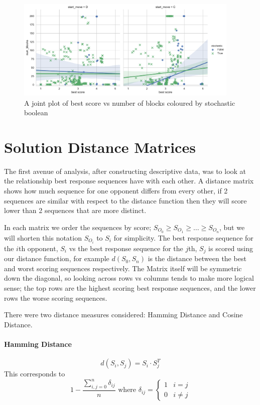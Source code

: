 \begin{figure}[ht]
    \includegraphics[width=0.95\textwidth, center]{./img/descriptive/cor_plot.pdf}
    \caption{A joint plot of best score vs number of blocks coloured by stochastic boolean}\label{fig:cor_plot}
\end{figure}

\section{Solution Distance Matrices}\label{sec:distance_matracies}
The first avenue of analysis, after constructing descriptive data, was to look at the relationship best response sequences have with each other.
A distance matrix shows how much  sequence for one opponent differs from every other, if 2 sequences are similar with respect to the distance function then they will score lower than 2 sequences that are more distinct.

In each matrix we order the sequences by score; $S_{O_0}\ge S_{O_1} \ge \ldots \ge S_{O_n}$, but we will shorten this notation $S_{O_i}$ to $S_{i}$ for simplicity.
The best response sequence for the $i$th opponent, $S_i$ vs the best response sequence for the $j$th, $S_j$ is scored using our distance function, for example $d(S_0,S_n)$ is the distance between the best and worst scoring sequences respectively.
The Matrix itself will be symmetric down the diagonal, so looking across rows vs columns tends to make more logical sense; the top rows are the highest scoring best response sequences, and the lower rows the worse scoring sequences.

There were two distance measures considered: Hamming Distance and Cosine Distance.

\paragraph{Hamming Distance}\cite{norouzi2012hamming}
$$d(S_i,S_j) = S_i \cdot S_j^T $$
This corresponds to 
$$ 1-\frac{\sum^n_{i,j=0}\delta_{ij}}{n}\text{ where } \delta_{ij} = \begin{cases} 
    1 & i=j \\
    0 & i\ne j 
\end{cases} $$

